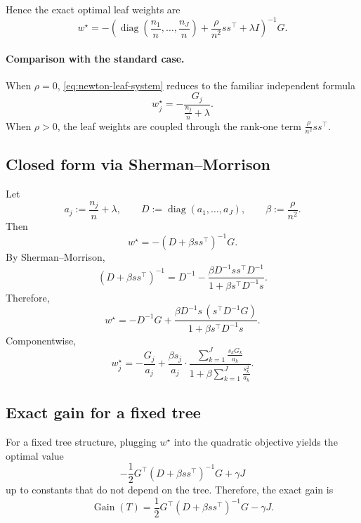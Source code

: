 \documentclass[11pt]{article}
\newcommand{\1}{\mathbf{1}}
\newcommand{\diag}{\operatorname{diag}}
\begin{document}
Hence the exact optimal leaf weights are
\begin{equation}
\label{eq:newton-leaf-system}
w^\star
=
-
\left(
\diag\left(\frac{n_1}{n},\dots,\frac{n_J}{n}\right)
+
\frac{\rho}{n^2}ss^\top
+
\lambda I
\right)^{-1}
G.
\end{equation}

\paragraph{Comparison with the standard case.}
When $\rho=0$, \eqref{eq:newton-leaf-system} reduces to the familiar independent formula
\[
w_j^\star
=
-\frac{G_j}{\frac{n_j}{n}+\lambda}.
\]
When $\rho>0$, the leaf weights are coupled through the rank-one term $\frac{\rho}{n^2}ss^\top$.

\subsection{Closed form via Sherman--Morrison}

Let
\[
a_j := \frac{n_j}{n}+\lambda,
\qquad
D := \diag(a_1,\dots,a_J),
\qquad
\beta := \frac{\rho}{n^2}.
\]
Then
\[
w^\star = -(D+\beta ss^\top)^{-1}G.
\]
By Sherman--Morrison,
\begin{equation}
\label{eq:sherman-morrison-newton}
(D+\beta ss^\top)^{-1}
=
D^{-1}
-
\frac{\beta D^{-1}ss^\top D^{-1}}
{1+\beta s^\top D^{-1}s}.
\end{equation}
Therefore,
\begin{equation}
\label{eq:newton-leaf-weights-closed-form}
w^\star
=
- D^{-1}G
+
\frac{\beta D^{-1}s \, (s^\top D^{-1}G)}
{1+\beta s^\top D^{-1}s}.
\end{equation}
Componentwise,
\begin{equation}
\label{eq:newton-leaf-weights-componentwise}
w_j^\star
=
-\frac{G_j}{a_j}
+
\frac{\beta s_j}{a_j}
\cdot
\frac{\sum_{k=1}^J \frac{s_k G_k}{a_k}}
{1+\beta \sum_{k=1}^J \frac{s_k^2}{a_k}}.
\end{equation}

\subsection{Exact gain for a fixed tree}

For a fixed tree structure, plugging $w^\star$ into the quadratic objective yields the optimal value
\[
-\frac{1}{2}
G^\top
(D+\beta ss^\top)^{-1}
G
+
\gamma J
\]
up to constants that do not depend on the tree. Therefore, the exact gain is
\begin{equation}
\label{eq:exact-gain}
\operatorname{Gain}(T)
=
\frac{1}{2}
G^\top
(D+\beta ss^\top)^{-1}
G
-
\gamma J.
\end{equation}
\end{document}
